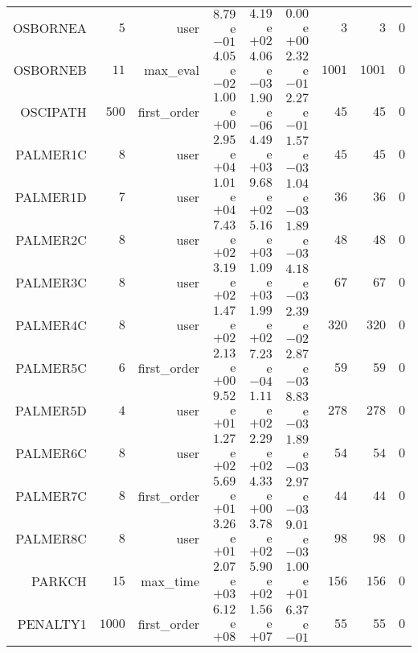 \begin{longtable}{rrrrrrrrr}
OSBORNEA & \(     5\) & user & \( 8.79\)e\(-01\) & \( 4.19\)e\(+02\) & \( 0.00\)e\(+00\) & \(     3\) & \(     3\) & \(     0\) \\
OSBORNEB & \(    11\) & max\_eval & \( 4.05\)e\(-02\) & \( 4.06\)e\(-03\) & \( 2.32\)e\(-01\) & \(  1001\) & \(  1001\) & \(     0\) \\
OSCIPATH & \(   500\) & first\_order & \( 1.00\)e\(+00\) & \( 1.90\)e\(-06\) & \( 2.27\)e\(-01\) & \(    45\) & \(    45\) & \(     0\) \\
PALMER1C & \(     8\) & user & \( 2.95\)e\(+04\) & \( 4.49\)e\(+03\) & \( 1.57\)e\(-03\) & \(    45\) & \(    45\) & \(     0\) \\
PALMER1D & \(     7\) & user & \( 1.01\)e\(+04\) & \( 9.68\)e\(+02\) & \( 1.04\)e\(-03\) & \(    36\) & \(    36\) & \(     0\) \\
PALMER2C & \(     8\) & user & \( 7.43\)e\(+02\) & \( 5.16\)e\(+03\) & \( 1.89\)e\(-03\) & \(    48\) & \(    48\) & \(     0\) \\
PALMER3C & \(     8\) & user & \( 3.19\)e\(+02\) & \( 1.09\)e\(+03\) & \( 4.18\)e\(-03\) & \(    67\) & \(    67\) & \(     0\) \\
PALMER4C & \(     8\) & user & \( 1.47\)e\(+02\) & \( 1.99\)e\(+02\) & \( 2.39\)e\(-02\) & \(   320\) & \(   320\) & \(     0\) \\
PALMER5C & \(     6\) & first\_order & \( 2.13\)e\(+00\) & \( 7.23\)e\(-04\) & \( 2.87\)e\(-03\) & \(    59\) & \(    59\) & \(     0\) \\
PALMER5D & \(     4\) & user & \( 9.52\)e\(+01\) & \( 1.11\)e\(+02\) & \( 8.83\)e\(-03\) & \(   278\) & \(   278\) & \(     0\) \\
PALMER6C & \(     8\) & user & \( 1.27\)e\(+02\) & \( 2.29\)e\(+02\) & \( 1.89\)e\(-03\) & \(    54\) & \(    54\) & \(     0\) \\
PALMER7C & \(     8\) & first\_order & \( 5.69\)e\(+01\) & \( 4.33\)e\(+00\) & \( 2.97\)e\(-03\) & \(    44\) & \(    44\) & \(     0\) \\
PALMER8C & \(     8\) & user & \( 3.26\)e\(+01\) & \( 3.78\)e\(+02\) & \( 9.01\)e\(-03\) & \(    98\) & \(    98\) & \(     0\) \\
PARKCH & \(    15\) & max\_time & \( 2.07\)e\(+03\) & \( 5.90\)e\(+02\) & \( 1.00\)e\(+01\) & \(   156\) & \(   156\) & \(     0\) \\
PENALTY1 & \(  1000\) & first\_order & \( 6.12\)e\(+08\) & \( 1.56\)e\(+07\) & \( 6.37\)e\(-01\) & \(    55\) & \(    55\) & \(     0\) \\

\end{longtable}
